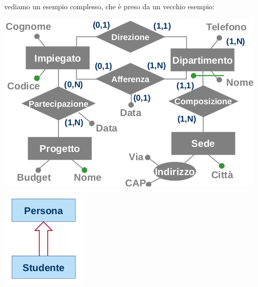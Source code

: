 \documentclass[a4paper,12pt, oneside]{book}
\begin{document}
vediamo un esempio complesso, che è preso da un vecchio esempio:
\begin{center}
	\includegraphics[scale=0.8]{img/er14.png}
\end{center}

\begin{center}
	\includegraphics[scale=0.8]{img/isa.png}
\end{center}
\end{document}

